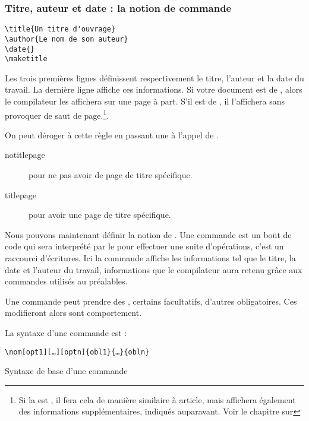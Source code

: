 \subsubsection{Titre, auteur et date : la notion de commande}

\begin{verbatim}
\title{Un titre d'ouvrage}
\author{Le nom de son auteur}
\date{}
\maketitle
\end{verbatim}

Les trois premières lignes définissent respectivement le titre, l'auteur et la date du travail.  
La dernière ligne affiche ces informations. Si votre document est de  , alors le compilateur les affichera sur une page à part. S'il est de  , il l'affichera sans provoquer de saut de page.\footnote{Si la  est , il fera cela de manière similaire à article, mais affichera également des informations supplémentaires, indiqués auparavant. Voir le chapitre sur }.

On peut déroger à cette règle en passant une  à l'appel de .
\begin{description}
\item[notitlepage] pour ne pas avoir de page de titre spécifique.
\item[titlepage] pour avoir une page de titre spécifique.
\end{description}

Nous pouvons maintenant définir la notion de . Une commande est un bout de code qui sera interprété par le  pour effectuer une suite d'opérations, c'est un raccourci d'écritures. 
Ici la commande  affiche les informations tel que le titre, la date et l'auteur du travail, informations que le compilateur aura retenu grâce aux commandes utilisés au préalables.

Une commande peut prendre des , certains facultatifs, d'autres obligatoires. Ces  modifieront alors sont comportement.

La syntaxe d'une commande est :


\begin{listing}[ht]

\begin{verbatim}
\nom[opt1][…][optn]{obl1}{…}{obln}
\end{verbatim}
\caption{Syntaxe de base d'une commande}
\end{listing}

